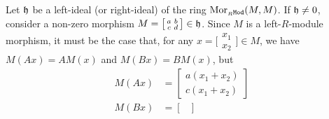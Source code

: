 \begin{example}
    Let \(\mathfrak{h}\) be a left-ideal (or right-ideal) of the ring
    \(\operatorname{Mor}_{{{}_{R}\texttt{Mod}}}(M, M)\). If \(\mathfrak{h} \neq 0\), consider a non-zero morphism
    \(M =
    \big[
        \begin{smallmatrix}
            a & b \\
            c & d
        \end{smallmatrix}
        \big]
    \in \mathfrak{h}\). Since \(M\) is a left-\(R\)-module morphism, it must be the
    case that, for any
    \(x =
    \big[
        \begin{smallmatrix}
            x_1 \\
            x_2
        \end{smallmatrix}
        \big]
    \in M\), we have \(M(A x) = A M(x)\) and \(M(B x) = B M(x)\), but
    \begin{align}
        \label{eq:M(Ax)}
        M(A x) & =
        \begin{bmatrix}
            a (x_1 + x_2) \\
            c (x_1 + x_2)
        \end{bmatrix}
        \\ %
        \label{eq:M(Bx)}
        M(B x) & =
        \begin{bmatrix}

\end{bmatrix}
\end{align}
\end{example}
